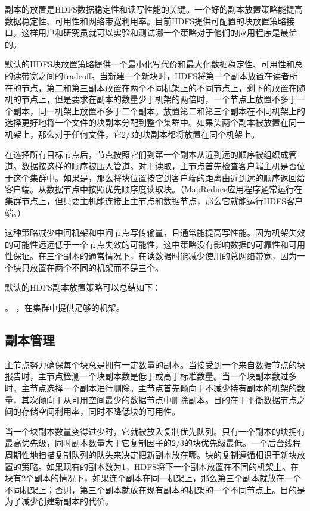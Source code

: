 副本的放置是HDFS数据稳定性和读写性能的关键。一个好的副本放置策略能提高数据稳定性、可用性和网络带宽利用率。目前HDFS提供可配置的块放置策略接口，这样用户和研究员就可以实验和测试哪一个策略对于他们的应用程序是最优的。

默认的HDFS块放置策略提供一个最小化写代价和最大化数据稳定性、可用性和总的读带宽之间的tradeoff。当新建一个新块时，HDFS将第一个副本放置在读者所在的节点，第二和第三副本放置在两个不同机架上的不同节点上，剩下的放置在随机的节点上，但是要求在副本的数量少于机架的两倍时，一个节点上放置不多于一个副本，同一机架上放置不多于二个副本。放置第二和第三个副本在不同机架上的选择更好地将一个文件的块副本分配到整个集群中。如果头两个副本被放置在同一机架上，那么对于任何文件，它2/3的块副本都将放置在同个机架上。

在选择所有目标节点后，节点按照它们到第一个副本从近到远的顺序被组织成管道。数据按这样的顺序被压入管道。对于读取，主节点首先检查客户端主机是否位于这个集群中。如果是，那么将块位置按它到客户端的距离由近到远的顺序返回给客户端。从数据节点中按照优先顺序度读取块。（MapReduce应用程序通常运行在集群节点上，但只要主机能连接上主节点和数据节点，那么它就能运行HDFS客户端。）

这种策略减少中间机架和中间节点写传输量，且通常能提高写性能。因为机架失效的可能性远远低于一个节点失效的可能性，这中策略没有影响数据的可靠性和可用性保证。在三个副本的通常情况下，在读数据时能减少使用的总网络带宽，因为一个块只放置在两个不同的机架而不是三个。

默认的HDFS副本放置策略可以总结如下：
\begin{itemize}
。
，在集群中提供足够的机架。
\end{itemize}
\subsection{副本管理}

主节点努力确保每个块总是拥有一定数量的副本。当接受到一个来自数据节点的块报告时，主节点检测一个块副本数是低于或高于标准数量。当一个块副本数过多时，主节点选择一个副本进行删除。主节点首先倾向于不减少持有副本的机架的数量，其次倾向于从可用空间最少的数据节点中删除副本。目的在于平衡数据节点之间的存储空间利用率，同时不降低块的可用性。

当一个块副本数量变得过少时，它就被放入复制优先队列。只有一个副本的块拥有最高优先级，同时副本数量大于它复制因子的2/3的块优先级最低。一个后台线程周期性地扫描复制队列的队头来决定把新副本放在哪。块的复制遵循相识于新块放置的策略。如果现有的副本数为1，HDFS将下一个副本放置在不同的机架上。在块有2个副本的情况下，如果连个副本在同一机架上，那么第三个副本就放在一个不同机架上；否则，第三个副本就放在现有副本的机架的一个不同节点上。目的是为了减少创建新副本的代价。

